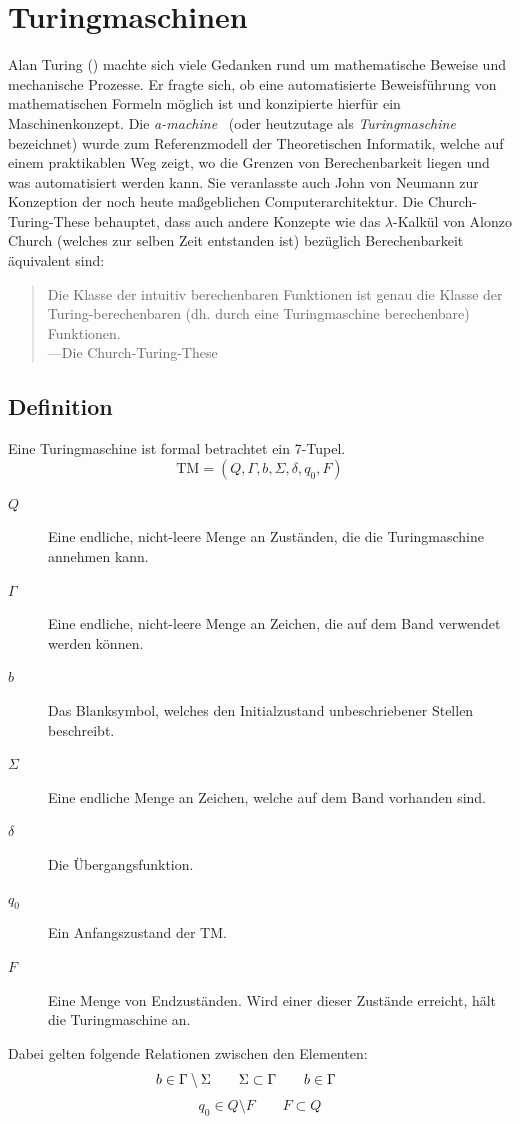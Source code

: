 \chapter{Turingmaschinen}
\label{sec:turingmachine}
\newcommand{\blank}{b}
%
Alan Turing () machte sich viele Gedanken rund um mathematische Beweise und mechanische Prozesse. Er fragte sich, ob eine automatisierte Beweisführung von mathematischen Formeln möglich ist und konzipierte hierfür ein Maschinenkonzept. Die \emph{a-machine}~\cite{Turing01011937} (oder heutzutage als \emph{Turingmaschine} bezeichnet) wurde zum Referenzmodell der Theoretischen Informatik, welche auf einem praktikablen Weg zeigt, wo die Grenzen von Berechenbarkeit liegen und was automatisiert werden kann. Sie veranlasste auch John von Neumann zur Konzeption der noch heute maßgeblichen Computerarchitektur. Die Church-Turing-These behauptet, dass auch andere Konzepte wie das $\lambda$-Kalkül von Alonzo Church (welches zur selben Zeit entstanden ist) bezüglich Berechenbarkeit äquivalent sind:
%
\begin{quotation}
 Die Klasse der intuitiv berechenbaren Funktionen ist genau die Klasse der Turing-berechenbaren (dh. durch eine Turingmaschine berechenbare) Funktionen. \\
 ---Die Church-Turing-These
\end{quotation}
%
\section{Definition}
%
Eine Turingmaschine ist formal betrachtet ein 7-Tupel.
\begin{equation}
  \text{TM} = (Q, \Gamma, \blank, \Sigma, \delta, q_0, F)
\end{equation}
%
\begin{description}
 \item[$Q$] Eine endliche, nicht-leere Menge an Zuständen, die die Turingmaschine annehmen kann.
 \item[$\Gamma$] Eine endliche, nicht-leere Menge an Zeichen, die auf dem Band verwendet werden können.
 \item[$\blank$] Das Blanksymbol, welches den Initialzustand unbeschriebener Stellen beschreibt.
 \item[$\Sigma$] Eine endliche Menge an Zeichen, welche auf dem Band vorhanden sind.
 \item[$\delta$] Die Übergangsfunktion.
 \item[$q_0$] Ein Anfangszustand der TM.
 \item[$F$] Eine Menge von Endzuständen. Wird einer dieser Zustände erreicht, hält die Turingmaschine an.
\end{description}
%
Dabei gelten folgende Relationen zwischen den Elementen:
\begin{displaymath}
  \blank \in \Gamma \setminus \Sigma  \qquad
  \Sigma \subset \Gamma  \mathspace  \blank \in \Gamma  \qquad
\end{displaymath}
\begin{displaymath}
  q_0 \in Q \setminus F \qquad
  F \subset Q
\end{displaymath}

